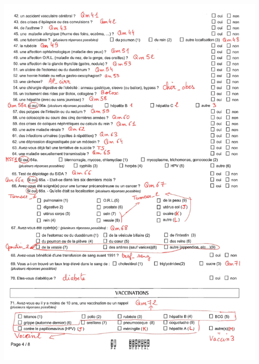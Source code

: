 \documentclass{book}
\begin{document}
\includegraphics[scale=.28]{quest_ipc-4.png}
\newpage
\end{document}
